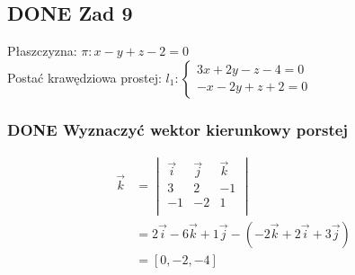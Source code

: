 \documentclass[11pt]{article}
\begin{document}
\subsection{{\bfseries\sffamily DONE} Zad 9}
\label{sec:org93373d2}
Płaszczyzna: \(\pi : x - y + z - 2 = 0\)
\\\empty
Postać krawędziowa prostej:
\(l_1 : \begin{cases}
3x + 2y - z - 4 = 0\\
-x - 2y + z + 2 = 0
\end{cases}\)
\subsubsection{{\bfseries\sffamily DONE} Wyznaczyć wektor kierunkowy porstej}
\label{sec:orgfe7161b}
\begin{align*}
  \vec k &= \begin{vmatrix}
              \vec i & \vec j & \vec k\\
              3 & 2 & -1 \\
              -1 & -2 & 1\\
            \end{vmatrix}
  \\
         &= 2 \vec i - 6 \vec k + 1 \vec j - (-2 \vec k + 2 \vec i + 3 \vec j)
  \\
         &= [0, -2, -4]
\end{align*}
\end{document}

